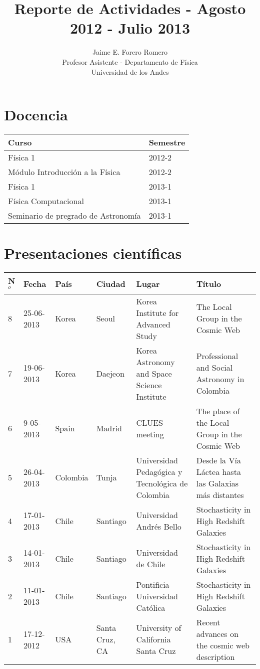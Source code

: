 \documentclass{article}
\title{Reporte de Actividades - Agosto 2012 - Julio 2013}
\author{Jaime E. Forero Romero\\Profesor Asistente - Departamento de
  F\'isica\\Universidad de los Andes}
\begin{document}
\maketitle

\section*{Docencia}

\begin{tabular}{p{7.0cm} p{1.5cm}}\hline
Curso & Semestre\\\hline
F\'isica 1 & 2012-2 \\
M\'odulo Introducci\'on a la F\'isica & 2012-2 \\
F\'isica 1 & 2013-1\\
F\'isica Computacional & 2013-1\\
Seminario de pregrado de Astronom\'ia & 2013-1\\\hline
\end{tabular}

\section*{Presentaciones cient\'ificas}

\begin{tabular}{lp{2.0cm} p{1.2cm} p{1.5cm} p{2cm} p{5cm}}\hline
N$^{o}$ & Fecha & Pa\'is & Ciudad & Lugar & T\'itulo \\\hline
8 & 25-06-2013 & Korea & Seoul & Korea Institute for Advanced Study &
The Local Group in the Cosmic Web\\ 
7 & 19-06-2013 & Korea & Daejeon & Korea Astronomy and Space Science
Institute & Professional and Social Astronomy in Colombia\\ 
6 & 9-05-2013 & Spain & Madrid & CLUES meeting & The place of the
Local Group in the Cosmic Web\\ 
5 & 26-04-2013 & Colombia & Tunja & Universidad Pedag\'ogica y
Tecnol\'ogica de Colombia & Desde la V\'ia L\'actea hasta las Galaxias
m\'as distantes\\ 
4 &17-01-2013 & Chile & Santiago  & Universidad Andr\'es Bello &
Stochasticity in High Redshift Galaxies\\ 
3 &14-01-2013 & Chile & Santiago  & Universidad de Chile&
Stochasticity in High Redshift Galaxies\\
2 & 11-01-2013 & Chile & Santiago  & Pontificia Universidad Cat\'olica&
Stochasticity in High Redshift Galaxies\\
1 & 17-12-2012 & USA & Santa Cruz, CA & University of California Santa
Cruz & Recent advances on the cosmic web description\\  \hline
\end{tabular}
\end{document}
